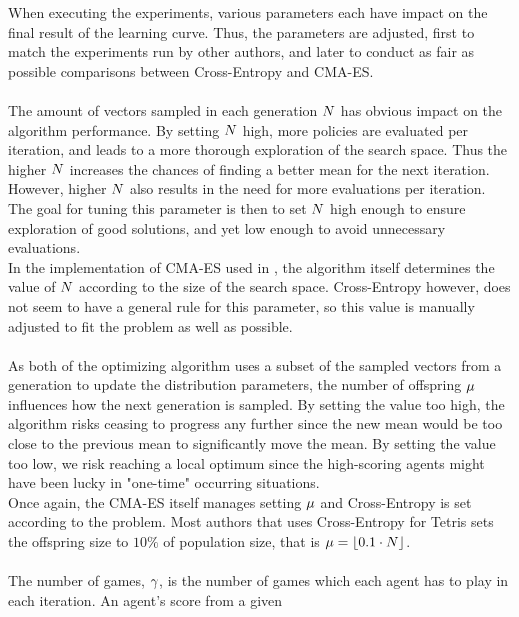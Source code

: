 When executing the experiments, various parameters each have 
impact on the final result of the learning curve. Thus, the parameters
are adjusted, first to match the experiments run by other authors, and later
to conduct as fair as possible comparisons between Cross-Entropy and 
CMA-ES.\\
\\
The amount of vectors sampled in each generation $N$
has obvious impact on the algorithm performance. By setting $N$
high, more policies are evaluated per iteration, and leads to a more thorough 
exploration of the search space. Thus the higher $N$ increases the
chances of finding a better mean for the next iteration.
However, higher $N$ also results in the
need for more evaluations per iteration. The goal for 
tuning this parameter is then
to set $N$ high enough to ensure 
exploration of good solutions, and yet 
low enough to avoid unnecessary evaluations.\\
In the implementation of CMA-ES used in \shark , 
the algorithm  itself determines
the value of $N$ according to the 
size of the search space. 
Cross-Entropy however, does not seem to have a 
general rule for this parameter,
so this value is manually adjusted to fit the 
problem as well as possible.\\
\\
As both of the optimizing algorithm uses a subset of the sampled vectors
from a generation to update the distribution parameters, the number of 
offspring $\mu$ influences how the next generation is sampled.
By setting the value too high, the algorithm risks ceasing to progress any 
further since the new mean would be too close to the previous mean to 
significantly move the mean. By setting the value too low,
we risk reaching a local optimum since the high-scoring agents 
might have been lucky in "one-time" occurring situations.\\
Once again, the CMA-ES itself manages setting $\mu$ and Cross-Entropy
is set according to the problem. Most authors that uses Cross-Entropy for Tetris
sets the offspring size to $10\%$ of population size, that is 
$\mu = \lfloor 0.1 \cdot N \rfloor $.\\
\\
The number of games, $\gamma$, is the number of games  which each agent 
has to play in each iteration. An agent's score from a given

